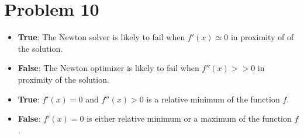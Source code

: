 \documentclass[12pt]{article}
\begin{document}
\newpage\section{Problem 10}

\begin{itemize}
\item {\bf True}: The Newton solver is likely to fail when $f'(x) \simeq 0$ in proximity of of the solution.
\item {\bf False}: The Newton optimizer is likely to fail when $f''(x) >> 0$ in proximity of the solution. 
\item {\bf True}: $f'(x)=0$ and $f''(x)>0$ is a relative minimum of the function $f$.
\item {\bf False}: $f'(x)=0$ is either relative minimum or a maximum of the function $f$.
\end{itemize}
\end{document}
